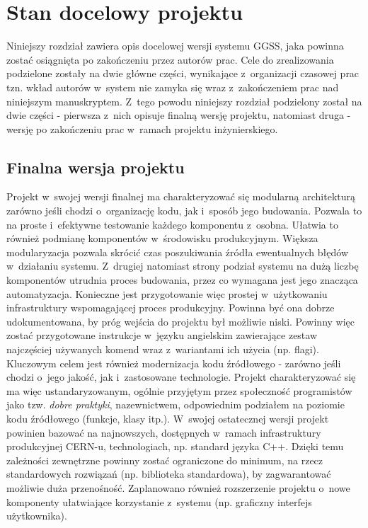 \chapter{Stan docelowy projektu}
\label{cha:docel}
Niniejszy rozdział zawiera opis docelowej wersji systemu GGSS, jaka powinna zostać osiągnięta po zakończeniu przez autorów prac. Cele do zrealizowania podzielone zostały na dwie główne części, wynikające z~organizacji czasowej prac tzn. wkład autorów w~system nie zamyka się wraz z~zakończeniem prac nad niniejszym manuskryptem. Z~tego powodu niniejszy rozdział podzielony został na dwie części - pierwsza z~nich opisuje finalną wersję projektu, natomiast druga - wersję po zakończeniu prac w~ramach projektu inżynierskiego.

\section{Finalna wersja projektu}
Projekt w~swojej wersji finalnej ma charakteryzować się modularną architekturą zarówno jeśli chodzi o~organizację kodu, jak i~sposób jego budowania. Pozwala to na proste i~efektywne testowanie każdego komponentu z~osobna. Ułatwia to również podmianę komponentów w~środowisku produkcyjnym. Większa modularyzacja pozwala skrócić czas poszukiwania źródła ewentualnych błędów w~działaniu systemu. Z~drugiej natomiast strony podział systemu na dużą liczbę komponentów utrudnia proces budowania, przez co wymagana jest jego znacząca automatyzacja. Konieczne jest przygotowanie więc prostej w~użytkowaniu infrastruktury wspomagającej proces produkcyjny. Powinna być ona dobrze udokumentowana, by próg wejścia do projektu był możliwie niski. Powinny więc zostać przygotowane instrukcje w~języku angielskim zawierające zestaw najczęściej używanych komend wraz z~wariantami ich użycia (np. flagi). Kluczowym celem jest również modernizacja kodu źródłowego - zarówno jeśli chodzi o~jego jakość, jak i~zastosowane technologie. Projekt charakteryzować się ma więc ustandaryzowanym, ogólnie przyjętym przez społeczność programistów jako tzw. \textit{dobre praktyki}, nazewnictwem, odpowiednim podziałem na poziomie kodu źródłowego (funkcje, klasy itp.). W~swojej ostatecznej wersji projekt powinien bazować na najnowszych, dostępnych w~ramach infrastruktury produkcyjnej CERN-u, technologiach, np. standard języka C++. Dzięki temu zależności zewnętrzne powinny zostać ograniczone do minimum, na rzecz standardowych rozwiązań (np. biblioteka standardowa), by zagwarantować możliwie duża przenośność. Zaplanowano również rozszerzenie projektu o~nowe komponenty ułatwiające korzystanie z~systemu (np. graficzny interfejs użytkownika).

